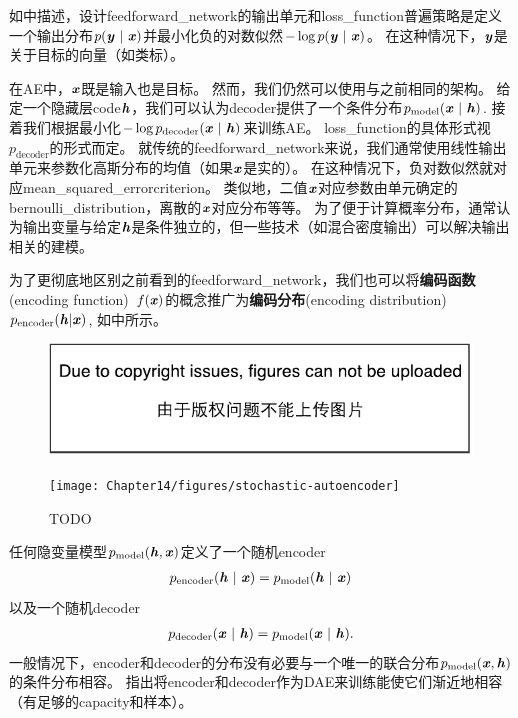 如中描述，设计\gls{feedforward_network}的输出单元和\gls{loss_function}普遍策略是定义一个输出分布$p(\boldsymbol{\mathit{y}} ~|~ \boldsymbol{\mathit{x}}) $并最小化负的对数似然$-\log p(\boldsymbol{\mathit{y}} ~|~ \boldsymbol{\mathit{x}})$。
在这种情况下，$\boldsymbol{\mathit{y}}$是关于目标的向量（如类标）。


在\gls{AE}中，$\boldsymbol{\mathit{x}}$既是输入也是目标。
然而，我们仍然可以使用与之前相同的架构。
给定一个隐藏层\gls{code}$\boldsymbol{\mathit{h}}$，我们可以认为\gls{decoder}提供了一个条件分布$p_{\text{model}}(\boldsymbol{\mathit{x}} ~|~ \boldsymbol{\mathit{h}})$. 
接着我们根据最小化$-\log p_{\text{decoder}}(\boldsymbol{\mathit{x}} ~|~ \boldsymbol{\mathit{h}})$来训练\gls{AE}。
\gls{loss_function}的具体形式视$p_{\text{decoder}}$的形式而定。
就传统的\gls{feedforward_network}来说，我们通常使用线性输出单元来参数化高斯分布的均值（如果$\boldsymbol{\mathit{x}}$是实的）。
在这种情况下，负对数似然就对应\gls{mean_squared_error}\gls{criterion}。
类似地，二值$\boldsymbol{\mathit{x}}$对应参数由单元确定的\gls{bernoulli_distribution}，离散的$\boldsymbol{\mathit{x}}$对应分布等等。
为了便于计算概率分布，通常认为输出变量与给定$\boldsymbol{\mathit{h}}$是条件独立的，但一些技术（如混合密度输出）可以解决输出相关的建模。


为了更彻底地区别之前看到的\gls{feedforward_network}，我们也可以将\textbf{编码函数}(encoding function)~$f(\boldsymbol{\mathit{x}})$的概念推广为\textbf{编码分布}(encoding distribution)~$ p_{\text{encoder}}(\boldsymbol{\mathit{h}} | \boldsymbol{\mathit{x}})$, 如中所示。

\begin{figure}[!htb]
\ifOpenSource
\centerline{\includegraphics{figure.pdf}}
\else
\centerline{\texttt{[image: Chapter14/figures/stochastic-autoencoder]}}
\fi
\caption{TODO}
\label{fig:chap14_stochastic-autoencoder}
\end{figure}

任何隐变量模型$p_{\text{model}}(\boldsymbol{\mathit{h}}, \boldsymbol{\mathit{x}})$定义了一个随机\gls{encoder}
\begin{align}
p_{\text{encoder}}(\boldsymbol{\mathit{h}} ~|~ \boldsymbol{\mathit{x}}) = p_{\text{model}}(\boldsymbol{\mathit{h}}~|~\boldsymbol{\mathit{x}})
\end{align}
以及一个随机\gls{decoder}
\begin{align}
p_{\text{decoder}}(\boldsymbol{\mathit{x}} ~|~ \boldsymbol{\mathit{h}}) = p_{\text{model}}(\boldsymbol{\mathit{x}}~|~\boldsymbol{\mathit{h}}).
\end{align}
一般情况下，\gls{encoder}和\gls{decoder}的分布没有必要与一个唯一的联合分布$p_{\text{model}}(\boldsymbol{\mathit{x}}, \boldsymbol{\mathit{h}})$的条件分布相容。
\citet{Alain-et-al-arxiv2015}指出将\gls{encoder}和\gls{decoder}作为\gls{DAE}来训练能使它们渐近地相容（有足够的\gls{capacity}和样本）。



